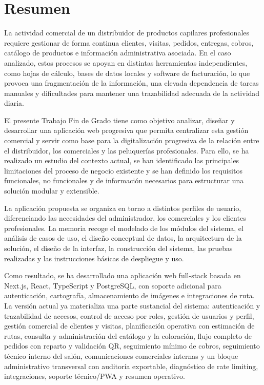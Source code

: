 \newpage{\ }
\thispagestyle{empty}
\chapter*{Resumen}

La actividad comercial de un distribuidor de productos capilares profesionales requiere gestionar de forma continua clientes, visitas, pedidos, entregas, cobros, catálogo de productos e información administrativa asociada. En el caso analizado, estos procesos se apoyan en distintas herramientas independientes, como hojas de cálculo, bases de datos locales y software de facturación, lo que provoca una fragmentación de la información, una elevada dependencia de tareas manuales y dificultades para mantener una trazabilidad adecuada de la actividad diaria.

El presente Trabajo Fin de Grado tiene como objetivo analizar, diseñar y desarrollar una aplicación web progresiva que permita centralizar esta gestión comercial y servir como base para la digitalización progresiva de la relación entre el distribuidor, los comerciales y las peluquerías profesionales. Para ello, se ha realizado un estudio del contexto actual, se han identificado las principales limitaciones del proceso de negocio existente y se han definido los requisitos funcionales, no funcionales y de información necesarios para estructurar una solución modular y extensible.

La aplicación propuesta se organiza en torno a distintos perfiles de usuario, diferenciando las necesidades del administrador, los comerciales y los clientes profesionales. La memoria recoge el modelado de los módulos del sistema, el análisis de casos de uso, el diseño conceptual de datos, la arquitectura de la solución, el diseño de la interfaz, la construcción del sistema, las pruebas realizadas y las instrucciones básicas de despliegue y uso.

Como resultado, se ha desarrollado una aplicación web full-stack basada en Next.js, React, TypeScript y PostgreSQL, con soporte adicional para autenticación, cartografía, almacenamiento de imágenes e integraciones de ruta. La versión actual ya materializa una parte sustancial del sistema: autenticación y trazabilidad de accesos, control de acceso por roles, gestión de usuarios y perfil, gestión comercial de clientes y visitas, planificación operativa con estimación de rutas, consulta y administración del catálogo y la coloración, flujo completo de pedidos con reparto y validación QR, seguimiento mínimo de cobros, seguimiento técnico interno del salón, comunicaciones comerciales internas y un bloque administrativo transversal con auditoría exportable, diagnóstico de rate limiting, integraciones, soporte técnico/PWA y resumen operativo.

